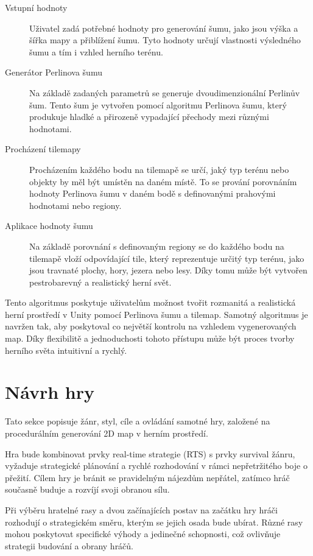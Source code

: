 \begin{description}
	\item[Vstupní hodnoty] Uživatel zadá potřebné hodnoty pro generování šumu, jako jsou výška a šířka mapy a přiblížení šumu. Tyto hodnoty určují vlastnosti výsledného šumu a tím i vzhled herního terénu.
	\item[Generátor Perlinova šumu] Na základě zadaných parametrů se generuje dvoudimenzionální Perlinův šum. Tento šum je vytvořen pomocí algoritmu Perlinova šumu, který produkuje hladké a přirozeně vypadající přechody mezi různými hodnotami.
	\item[Procházení tilemapy] Procházením každého bodu na tilemapě se určí, jaký typ terénu nebo objekty by měl být umístěn na daném místě. To se prování porovnáním hodnoty Perlinova šumu v daném bodě s definovanými prahovými hodnotami nebo regiony.
	\item[Aplikace hodnoty šumu] Na základě porovnání s definovaným regiony se do každého bodu na tilemapě vloží odpovídající tile, který reprezentuje určitý typ terénu, jako jsou travnaté plochy, hory, jezera nebo lesy. Díky tomu může být vytvořen pestrobarevný a realistický herní svět.
\end{description}

Tento algoritmus poskytuje uživatelům možnost tvořit rozmanitá a realistická herní prostředí v Unity pomocí Perlinova šumu a tilemap. Samotný algoritmus je navržen tak, aby poskytoval co největší kontrolu na vzhledem vygenerovaných map. Díky flexibilitě a jednoduchosti tohoto přístupu může být proces tvorby herního světa intuitivní a rychlý. 

\section{Návrh hry}
\label{GameDesign}
Tato sekce popisuje žánr, styl, cíle a ovládání samotné hry, založené na procedurálním generování 2D map v herním prostředí.

Hra bude kombinovat prvky real-time strategie (RTS) s prvky survival žánru, vyžaduje strategické plánování a rychlé rozhodování v rámci nepřetržitého boje o přežití. Cílem hry je bránit se pravidelným nájezdům nepřátel, zatímco hráč současně buduje a rozvíjí svoji obranou sílu.

Při výběru hratelné rasy a dvou začínajících postav na začátku hry hráči rozhodují o strategickém směru, kterým se jejich osada bude ubírat. Různé rasy mohou poskytovat specifické výhody a jedinečné schopnosti, což ovlivňuje strategii budování a obrany hráčů.


